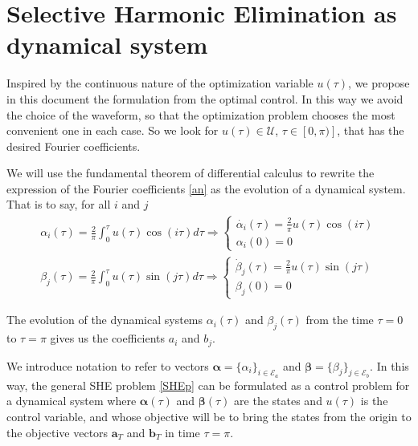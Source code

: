 \section{Selective Harmonic Elimination as dynamical system}\label{Section3}

Inspired by the continuous nature of the optimization variable $u(\tau)$, we propose in this document the formulation from the optimal control. In this way we avoid the choice of the waveform, so that the optimization problem chooses the most convenient one in each case. So we look for $u (\tau)\in \mathcal{U}$, $\tau \in [0,\pi)]$, that has the desired Fourier coefficients.

We will use the fundamental theorem of differential calculus to rewrite the expression of the Fourier coefficients \eqref{an} as the evolution of a dynamical system. That is to say, for all $i$ and $j$
\begin{align*}
    \alpha_i(\tau) = \frac{2}{\pi}\int_0^\tau u(\tau) \cos(i\tau)d\tau 
    \Rightarrow
    \begin{cases} 
        \dot{\alpha_i}(\tau)  = \frac{2}{\pi}u(\tau)\cos(i\tau) \\  
        \alpha_i(0)  = 0       
    \end{cases}
	\\[10pt]
	\beta_j(\tau) = \frac{2}{\pi}\int_0^\tau u(\tau) \sin(j\tau)d\tau 
	\Rightarrow
	\begin{cases} 
		\dot{\beta}_j(\tau)  = \frac{2}{\pi}u(\tau)\sin(j\tau) \\  
		\beta_j(0) = 0       
	\end{cases}
\end{align*}

The evolution of the dynamical systems $\alpha_i(\tau)$ and $\beta_j(\tau) $ from the time $\tau = 0 $ to $\tau = \pi$ gives us the coefficients $a_i$ and $b_j$.

We introduce notation to refer to vectors $\bm{\alpha} = \{\alpha_i\}_{i\in\mathcal{E}_a}$ and $\bm{\beta} = \{\beta_j\}_{j\in\mathcal{E}_b}$.
%
In this way, the general SHE problem \eqref{SHEp} can be formulated as a control problem for a dynamical system where $\bm{\alpha}(\tau)$ and $\bm{\beta}(\tau)$ are the states and $u(\tau)$ is the control variable, and whose objective will be to bring the states from the origin to the objective vectors $\bm{a}_T$ and $\bm{b}_T $ in time $\tau = \pi$.

